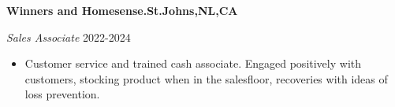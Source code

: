\textbf{Winners and Homesense.\hfill St.Johns,NL,CA}\par

\textit{Sales Associate } \hfill 2022-2024
\begin{itemize}
	\item Customer service and trained cash associate. Engaged positively with customers, stocking product
when in the salesfloor, recoveries with ideas of loss prevention.
\end{itemize}\par